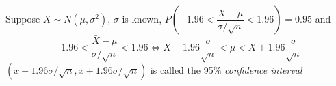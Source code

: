\documentclass[main]{subfiles}
\begin{document}
\begin{definition}
Suppose $X\sim N(\mu,\sigma^2)$, $\sigma$ is known, $P\left(-1.96<\dfrac{\bar X-\mu}{\sigma/\sqrt n}<1.96\right)=0.95$ and
\[-1.96<\dfrac{\bar X-\mu}{\sigma/\sqrt n}<1.96\iff \bar X-1.96\frac{\sigma}{\sqrt n}<\mu<\bar X+1.96\frac{\sigma}{\sqrt n}\]
$(\bar x-1.96\sigma/\sqrt{n},\bar x+1.96\sigma/\sqrt{n})$ is called the 95\% \textit{confidence interval}
\end{definition}
\end{document}
